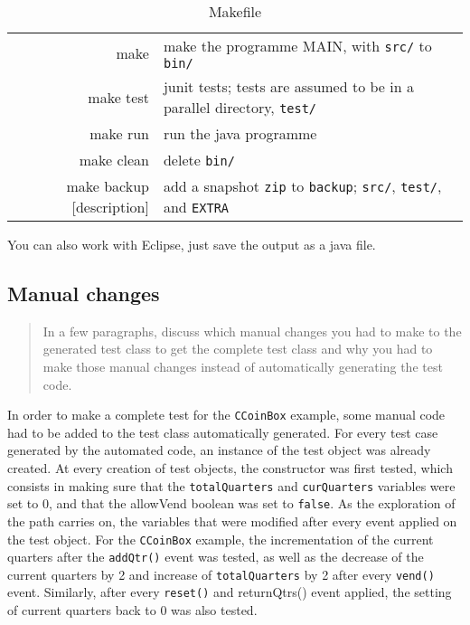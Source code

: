 \documentclass[ieee]{submit}
\begin{document}
\begin{table}[htdp]
\begin{center}
\begin{tabular}{rp{3in}}
make&				make the programme MAIN, with {\tt src/} to {\tt bin/}\\
make test&			junit tests; tests are assumed to be in a parallel directory, {\tt test/}\\
make run&			run the java programme\\
make clean&			delete {\tt bin/}\\
make backup [description]&	add a snapshot {\tt zip} to {\tt backup}; {\tt src/}, {\tt test/}, and {\tt EXTRA}
\end{tabular}
\end{center}
\caption{Makefile}
\label{Makefile}
\end{table}%


You can also work with Eclipse, just save the output as a java file.

\subsection{Manual changes}

\begin{quote}
In a few paragraphs, discuss which manual changes you had to make to the generated test class to get the complete test class and why you had to make those manual changes instead of automatically generating the test code.
\end{quote}

In order to make a complete test for the {\tt CCoinBox} example, some manual code had to be added to the test class automatically generated. For every test case generated by the automated code, an instance of the test object was already created. At every creation of test objects, the constructor was first tested, which consists in making sure that the {\tt totalQuarters} and {\tt curQuarters} variables were set to 0, and that the allowVend boolean was set to {\tt false}. 
As the exploration of the path carries on, the variables that were modified after every event applied on the test object. For the {\tt CCoinBox} example, the incrementation of the current quarters after the {\tt addQtr()} event was tested, as well as the decrease of the current quarters by 2 and increase of {\tt totalQuarters} by 2 after every {\tt vend()} event. Similarly, after every {\tt reset()} and {returnQtrs()} event applied, the setting of current quarters back to 0 was also tested.
\end{document}

